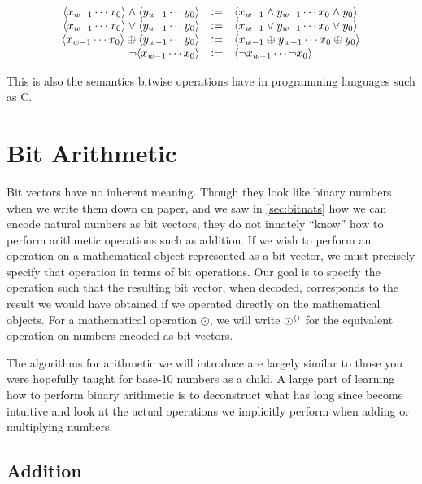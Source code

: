 \begin{definition}
  \[
    \begin{array}{rcl}
      \langle x_{w-1}\cdots x_{0} \rangle \land \langle y_{w-1}\cdots y_{0} \rangle
      &\vcentcolon=& \langle x_{w-1} \land y_{w-1}\cdots x_{0} \land y_{0} \rangle \\
      \langle x_{w-1}\cdots x_{0} \rangle \lor \langle y_{w-1}\cdots y_{0} \rangle
      &\vcentcolon=& \langle x_{w-1} \lor y_{w-1} \cdots x_{0} \lor y_{0} \rangle \\
      \langle x_{w-1}\cdots x_{0} \rangle \oplus \langle y_{w-1}\cdots y_{0} \rangle
      &\vcentcolon=& \langle x_{w-1} \oplus y_{w-1}\cdots x_{0} \oplus y_{0} \rangle \\
      \neg \langle x_{w-1}\cdots x_{0} \rangle
      &\vcentcolon=& \langle \neg x_{w-1}\cdots \neg x_{0} \rangle
    \end{array}
  \]
  \label{def:wordbitwise}
\end{definition}

This is also the semantics bitwise operations have in programming
languages such as C.

\section{Bit Arithmetic}
\label{sec:bit-arithmetic}

Bit vectors have no inherent meaning.  Though they look like binary
numbers when we write them down on paper, and we saw in
\cref{sec:bitnats} how we can encode natural numbers as bit vectors,
they do not innately ``know'' how to perform arithmetic operations
such as addition.  If we wish to perform an operation on a
mathematical object represented as a bit vector, we must precisely
specify that operation in terms of bit operations.  Our goal is to
specify the operation such that the resulting bit vector, when
decoded, corresponds to the result we would have obtained if we
operated directly on the mathematical objects.  For a mathematical
operation $\odot$, we will write $\operatorname{\odot^{\langle\rangle}}$ for the equivalent
operation on numbers encoded as bit vectors.

The algorithms for arithmetic we will introduce are largely similar to
those you were hopefully taught for base-10 numbers as a child.  A
large part of learning how to perform binary arithmetic is to
deconstruct what has long since become intuitive and look at the
actual operations we implicitly perform when adding or multiplying
numbers.

\subsection{Addition}
\label{sec:bit-addition}

